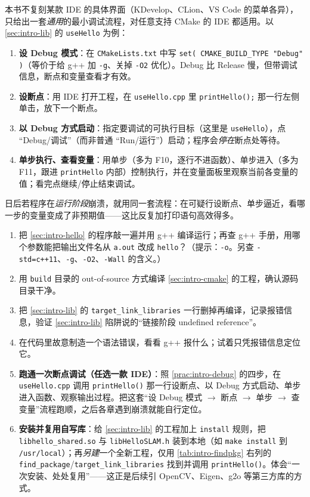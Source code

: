 \begin{practice}\label{prac:intro-debug}
本书不复刻某款 IDE 的具体界面（KDevelop、CLion、VS Code 的菜单各异），只给出一套\emph{通用}的最小调试流程，对任意支持 CMake 的 IDE 都适用\cite{gaoxiang2019slam14}。以 \cref{sec:intro-lib} 的 \texttt{useHello} 为例：
\begin{enumerate}
  \item \textbf{设 Debug 模式}：在 \texttt{CMakeLists.txt} 中写 \texttt{set( CMAKE\_BUILD\_TYPE "Debug" )}（等价于给 g++ 加 \texttt{-g}、关掉 \texttt{-O2} 优化）。Debug 比 Release 慢，但带调试信息，断点和变量查看才有效。
  \item \textbf{设断点}：用 IDE 打开工程，在 \texttt{useHello.cpp} 里 \texttt{printHello();} 那一行左侧单击，放下一个断点。
  \item \textbf{以 Debug 方式启动}：指定要调试的可执行目标（这里是 \texttt{useHello}），点 “Debug/调试”（而非普通 “Run/运行”）启动；程序会\emph{停在}断点处等待。
  \item \textbf{单步执行、查看变量}：用单步（多为 F10，逐行不进函数）、单步进入（多为 F11，跟进 \texttt{printHello} 内部）控制执行，并在变量面板里观察当前各变量的值；看完点继续/停止结束调试。
\end{enumerate}
日后若程序在\emph{运行阶段}崩溃，就用同一套流程：在可疑行设断点、单步逼近，看哪一步的变量变成了非预期值——这比反复加打印语句高效得多。
\end{practice}

\begin{practice}
\begin{enumerate}
  \item 把 \cref{sec:intro-hello} 的程序敲一遍并用 g++ 编译运行；再查 g++ 手册，用哪个参数能把输出文件名从 \texttt{a.out} 改成 \texttt{hello}？（提示：\texttt{-o}。另查 \texttt{-std=c++11}、\texttt{-g}、\texttt{-O2}、\texttt{-Wall} 的含义。）
  \item 用 \texttt{build} 目录的 out-of-source 方式编译 \cref{sec:intro-cmake} 的工程，确认源码目录干净。
  \item 把 \cref{sec:intro-lib} 的 \texttt{target\_link\_libraries} 一行删掉再编译，记录报错信息，验证 \cref{sec:intro-lib} 陷阱说的“链接阶段 undefined reference”。
  \item 在代码里故意制造一个语法错误，看看 g++ 报什么；试着只凭报错信息定位它。
  \item \textbf{跑通一次断点调试（任选一款 IDE）}：照 \cref{prac:intro-debug} 的四步，在 \texttt{useHello.cpp} 调用 \texttt{printHello()} 那一行设断点、以 Debug 方式启动、单步进入函数、观察输出过程。把这套“设 Debug 模式 $\to$ 断点 $\to$ 单步 $\to$ 查变量”流程跑顺，之后各章遇到崩溃就能自行定位。
  \item \textbf{安装并复用自写库}：给 \cref{sec:intro-lib} 的工程加上 \texttt{install} 规则，把 \texttt{libhello\_shared.so} 与 \texttt{libHelloSLAM.h} 装到本地（如 \texttt{make install} 到 \texttt{/usr/local}）；再\emph{另建}一个全新工程，仅用 \cref{tab:intro-findpkg} 右列的 \texttt{find\_package}/\texttt{target\_link\_libraries} 找到并调用 \texttt{printHello()}。体会“一次安装、处处复用”——这正是后续引 OpenCV、Eigen、g2o 等第三方库的方式\cite{gaoxiang2019slam14}。
\end{enumerate}
\end{practice}

